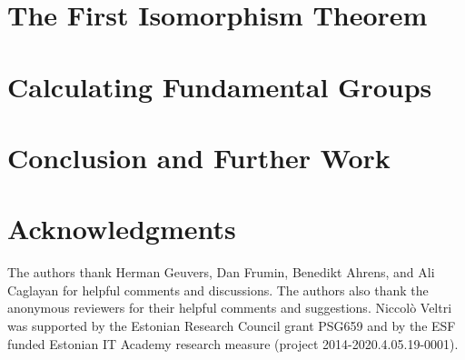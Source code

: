 \documentclass{lmcs}
\theoremstyle{plain}
\theoremstyle{definition}
\begin{document}
\section{The First Isomorphism Theorem}
\label{sec:isomorphism_theorem}


\section{Calculating Fundamental Groups}
\label{sec:fundamental_groups}


\section{Conclusion and Further Work}
\label{sec:conclusion}



\section*{Acknowledgments}
The authors thank Herman Geuvers, Dan Frumin, Benedikt Ahrens, and Ali Caglayan for helpful comments and discussions.
The authors also thank the anonymous reviewers for their helpful comments and suggestions.
Niccol{\`o} Veltri was supported by the Estonian Research Council grant PSG659 and by the ESF funded
Estonian IT Academy research measure (project 2014-2020.4.05.19-0001).



\end{document}
